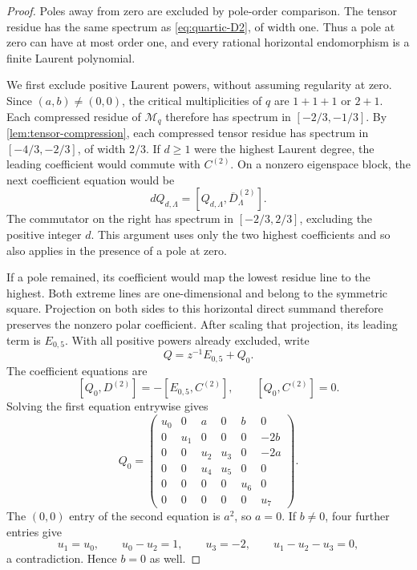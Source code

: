 \documentclass[11pt]{article}
\numberwithin{equation}{section}
\theoremstyle{definition}
\theoremstyle{remark}
\newcommand{\Mcal}{\mathcal M}
\begin{document}
\begin{proof}
Poles away from zero are excluded by pole-order comparison.  The tensor
residue has the same spectrum as \eqref{eq:quartic-D2}, of width one.
Thus a pole at zero can have at most order one, and every rational
horizontal endomorphism is a finite Laurent polynomial.

We first exclude positive Laurent powers, without assuming regularity at
zero.  Since $(a,b)\ne(0,0)$, the critical multiplicities of $q$ are
$1+1+1$ or $2+1$.  Each compressed residue of $\Mcal_q$ therefore has
spectrum in $[-2/3,-1/3]$.  By \cref{lem:tensor-compression}, each
compressed tensor residue has spectrum in $[-4/3,-2/3]$, of width $2/3$.
If $d\ge1$ were the highest Laurent degree, the leading coefficient
would commute with $C^{(2)}$.  On a nonzero eigenspace block, the next
coefficient equation would be
\[
  dQ_{d,\Lambda}=[Q_{d,\Lambda},\overline D^{(2)}_\Lambda].
\]
The commutator on the right has spectrum in $[-2/3,2/3]$, excluding the
positive integer $d$.  This argument uses only the two highest
coefficients and so also applies in the presence of a pole at zero.

If a pole remained, its coefficient would map the lowest residue line to
the highest.  Both extreme lines are one-dimensional and belong to the
symmetric square.  Projection on both sides to this horizontal direct
summand therefore preserves the nonzero polar coefficient.  After scaling
that projection, its leading term is $E_{0,5}$.  With all positive powers
already excluded, write
\[
  Q=z^{-1}E_{0,5}+Q_0.
\]
The coefficient equations are
\[
  [Q_0,D^{(2)}]=-[E_{0,5},C^{(2)}],
  \qquad
  [Q_0,C^{(2)}]=0.
\]
Solving the first equation entrywise gives
\[
Q_0=
\begin{pmatrix}
 u_0&0&a&0&b&0\\
 0&u_1&0&0&0&-2b\\
 0&0&u_2&u_3&0&-2a\\
 0&0&u_4&u_5&0&0\\
 0&0&0&0&u_6&0\\
 0&0&0&0&0&u_7
\end{pmatrix}.
\]
The $(0,0)$ entry of the second equation is $a^2$, so $a=0$.  If
$b\ne0$, four further entries give
\[
  u_1=u_0,
  \qquad u_0-u_2=1,
  \qquad u_3=-2,
  \qquad u_1-u_2-u_3=0,
\]
a contradiction.  Hence $b=0$ as well.
\end{proof}
\end{document}
